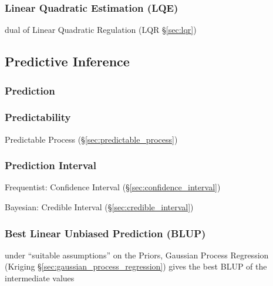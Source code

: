 \subsubsection{Linear Quadratic Estimation (LQE)}\label{sec:lqe}

dual of Linear Quadratic Regulation (LQR \S\ref{sec:lqr})



\subsection{Predictive Inference}\label{sec:predictive_inference}

\subsubsection{Prediction}\label{sec:prediction}

\subsubsection{Predictability}\label{sec:predictability}

\fist Predictable Process (\S\ref{sec:predictable_process})



\subsubsection{Prediction Interval}\label{sec:prediction_interval}

Frequentist: Confidence Interval (\S\ref{sec:confidence_interval})

Bayesian: Credible Interval (\S\ref{sec:credible_interval})



\subsubsection{Best Linear Unbiased Prediction (BLUP)}\label{sec:blup}

under ``suitable assumptions'' on the Priors, Gaussian Process Regression
(Kriging \S\ref{sec:gaussian_process_regression}) gives the best BLUP of the
intermediate values



